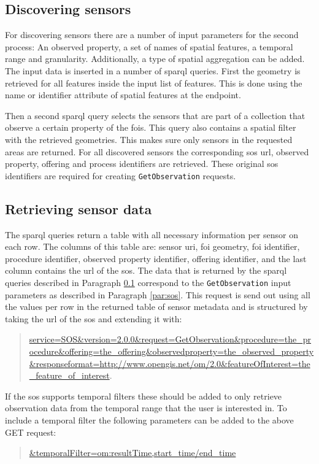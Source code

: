 \subsection{Discovering sensors}
\label{par:discover}
For discovering sensors there are a number of input parameters for the second process: An observed property, a set of names of spatial features, a temporal range and granularity. Additionally, a type of spatial aggregation can be added. The input data is inserted in a number of \ac{sparql} queries. First the geometry is retrieved for all features inside the input list of features. This is done using the name or identifier attribute of spatial features at the endpoint.  

Then a second \ac{sparql} query selects the sensors that are part of a collection that observe a certain property of the \acp{foi}. This query also contains a spatial filter with the retrieved geometries. This makes sure only sensors in the requested areas are returned. For all discovered sensors the corresponding \ac{sos} \ac{url}, observed property, offering and process identifiers are retrieved. These original \ac{sos} identifiers are required for creating \texttt{GetObservation} requests.  

\subsection{Retrieving sensor data}
\label{par:retrieve}
 The \ac{sparql} queries return a table with all necessary information per sensor on each row. The columns of this table are: sensor \ac{uri}, \ac{foi} geometry, \ac{foi} identifier, procedure identifier, observed property identifier, offering identifier, and the last column contains the \ac{url} of the \ac{sos}. The data that is returned by the \ac{sparql} queries described in Paragraph \ref{par:discover} correspond to the \texttt{GetObservation} input parameters as described in Paragraph \ref{par:sos}. This request is send out using all the values per row in the returned table of sensor metadata and is structured by taking the \ac{url} of the \ac{sos} and extending it with: 
 \begin{quote}
 	\url{service=SOS&version=2.0.0&request=GetObservation&procedure=the_procedure&offering=the_offering&observedproperty=the_observed_property&responseformat=http://www.opengis.net/om/2.0&featureOfInterest=the_feature_of_interest}. 
 \end{quote} 
 
 If the \ac{sos} supports temporal filters these should be added to only retrieve observation data from the temporal range that the user is interested in. To include a temporal filter the following parameters can be added to the above GET request:
\begin{quote}
	\url{&temporalFilter=om:resultTime,start_time/end_time}
\end{quote} 


